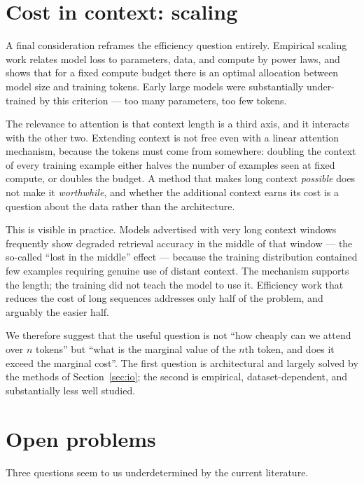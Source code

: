 \documentclass[11pt,a4paper]{article}
\begin{document}
\section{Cost in context: scaling}
\label{sec:scaling}

A final consideration reframes the efficiency question entirely. Empirical
scaling work relates model loss to parameters, data, and compute by power
laws, and shows that for a fixed compute budget there is an optimal allocation
between model size and training tokens. Early large models were substantially
under-trained by this criterion --- too many parameters, too few tokens.

The relevance to attention is that context length is a third axis, and it
interacts with the other two. Extending context is not free even with a linear
attention mechanism, because the tokens must come from somewhere: doubling the
context of every training example either halves the number of examples seen at
fixed compute, or doubles the budget. A method that makes long context
\emph{possible} does not make it \emph{worthwhile}, and whether the additional
context earns its cost is a question about the data rather than the
architecture.

This is visible in practice. Models advertised with very long context windows
frequently show degraded retrieval accuracy in the middle of that window ---
the so-called ``lost in the middle'' effect --- because the training
distribution contained few examples requiring genuine use of distant context.
The mechanism supports the length; the training did not teach the model to use
it. Efficiency work that reduces the cost of long sequences addresses only
half of the problem, and arguably the easier half.

We therefore suggest that the useful question is not ``how cheaply can we
attend over $n$ tokens'' but ``what is the marginal value of the $n$th token,
and does it exceed the marginal cost''. The first question is architectural
and largely solved by the methods of Section~\ref{sec:io}; the second is
empirical, dataset-dependent, and substantially less well studied.

\section{Open problems}
\label{sec:open}

Three questions seem to us underdetermined by the current literature.
\end{document}
